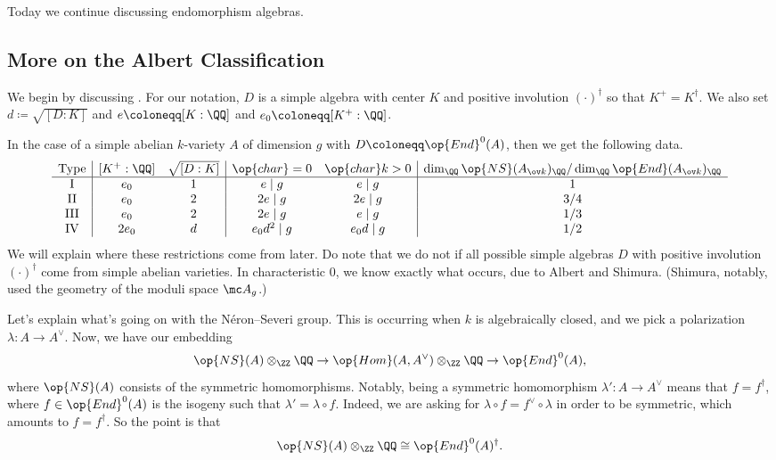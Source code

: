 \documentclass[../notes.tex]{subfiles}
\begin{document}
Today we continue discussing endomorphism algebras.

\subsection{More on the Albert Classification}
We begin by discussing . For our notation, $D$ is a simple algebra with center $K$ and positive involution $(\cdot)^\dagger$ so that $K^+=K^\dagger$. We also set $d\coloneqq\sqrt{[D:K]}$ and $e\coloneqq[K:\QQ]$ and $e_0\coloneqq[K^+:\QQ]$.
\begin{remark}
	In the case of a simple abelian $k$-variety $A$ of dimension $g$ with $D\coloneqq\op{End}^0(A)$, then we get the following data.
	\[\begin{array}{c|cc|cc|c}
		\text{Type} & [K^+:\QQ] & \sqrt{[D:K]} & {\op{char}}=0 & {\op{char}k}>0 & \dim_\QQ\op{NS}(A_{\ov k})_\QQ/\dim_\QQ\op{End}(A_{\ov k})_\QQ\\\hline
		\text{I}	&  e_0 & 1 &      e\mid g & e\mid g & 1 \\
		\text{II}	&  e_0 & 2 &     2e\mid g & 2e\mid g & 3/4 \\
		\text{III}	&  e_0 & 2 &     2e\mid g & e\mid g & 1/3 \\
		\text{IV}	& 2e_0 & d & e_0d^2\mid g & e_0d\mid g & 1/2
	\end{array}\]
	We will explain where these restrictions come from later. Do note that we do not if all possible simple algebras $D$ with positive involution $(\cdot)^\dagger$ come from simple abelian varieties. In characteristic $0$, we know exactly what occurs, due to Albert and Shimura. (Shimura, notably, used the geometry of the moduli space $\mc A_g$.)
\end{remark}
\begin{remark}
	Let's explain what's going on with the N\'eron--Severi group. This is occurring when $k$ is algebraically closed, and we pick a polarization $\lambda\colon A\to A^\lor$. Now, we have our embedding
	\[\op{NS}(A)\otimes_\ZZ\QQ\to\op{Hom}(A,A^\lor)\otimes_\ZZ\QQ\to\op{End}^0(A),\]
	where $\op{NS}(A)$ consists of the symmetric homomorphisms. Notably, being a symmetric homomorphism $\lambda'\colon A\to A^\lor$ means that $f=f^\dagger$, where $f\in\op{End}^0(A)$ is the isogeny such that $\lambda'=\lambda\circ f$. Indeed, we are asking for $\lambda\circ f=f^\lor\circ\lambda$ in order to be symmetric, which amounts to $f=f^\dagger$. So the point is that
	\[\op{NS}(A)\otimes_\ZZ\QQ\cong\op{End}^0(A)^\dagger.\]
\end{remark}
\end{document}
